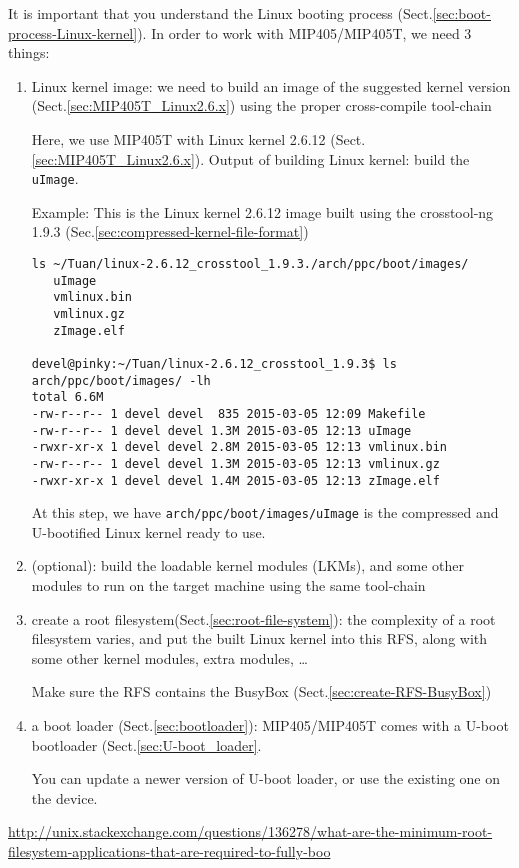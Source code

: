 It is important that you understand the Linux booting process
(Sect.\ref{sec:boot-process-Linux-kernel}). 
In order to work with
MIP405/MIP405T, we need 3 things:
\begin{enumerate}  
  \item Linux kernel image: we need to build an image of the suggested kernel
  version (Sect.\ref{sec:MIP405T_Linux2.6.x}) using the proper cross-compile tool-chain

Here, we use MIP405T with Linux kernel 2.6.12
(Sect.\ref{sec:MIP405T_Linux2.6.x}).
Output of building Linux kernel: build the \verb!uImage!.

Example: This is the Linux kernel 2.6.12 image built using the crosstool-ng
1.9.3 (Sec.\ref{sec:compressed-kernel-file-format})
\begin{verbatim}
ls ~/Tuan/linux-2.6.12_crosstool_1.9.3./arch/ppc/boot/images/
   uImage
   vmlinux.bin
   vmlinux.gz
   zImage.elf
   
devel@pinky:~/Tuan/linux-2.6.12_crosstool_1.9.3$ ls arch/ppc/boot/images/ -lh
total 6.6M
-rw-r--r-- 1 devel devel  835 2015-03-05 12:09 Makefile
-rw-r--r-- 1 devel devel 1.3M 2015-03-05 12:13 uImage
-rwxr-xr-x 1 devel devel 2.8M 2015-03-05 12:13 vmlinux.bin
-rw-r--r-- 1 devel devel 1.3M 2015-03-05 12:13 vmlinux.gz
-rwxr-xr-x 1 devel devel 1.4M 2015-03-05 12:13 zImage.elf   
\end{verbatim}

At this step, we have \verb!arch/ppc/boot/images/uImage! is the compressed and
U-bootified Linux kernel ready to use.
  
  \item (optional): build the loadable kernel modules (LKMs), and some other
  modules to run on the target machine using the same tool-chain
  
  \item create a root filesystem(Sect.\ref{sec:root-file-system}): the
  complexity of a root filesystem varies, and put the built Linux kernel into
  this RFS, along with some other kernel modules, extra modules, \ldots

Make sure the RFS contains the BusyBox (Sect.\ref{sec:create-RFS-BusyBox})
  
  \item a boot loader (Sect.\ref{sec:bootloader}): 
  MIP405/MIP405T comes with a U-boot bootloader (Sect.\ref{sec:U-boot_loader}.
  
  You can update a newer version of U-boot loader, or use the existing one on
  the device.
\end{enumerate}
\url{http://unix.stackexchange.com/questions/136278/what-are-the-minimum-root-filesystem-applications-that-are-required-to-fully-boo}

